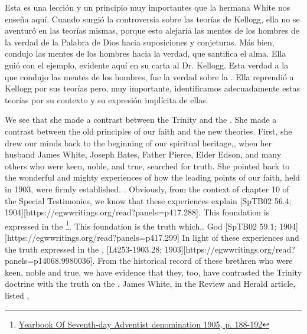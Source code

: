 Esta es una lección y un principio muy importantes que la hermana White nos enseña aquí. Cuando surgió la controversia sobre las teorías de Kellogg, ella no se aventuró en las teorías mismas, porque esto alejaría las mentes de los hombres de la verdad de la Palabra de Dios hacia suposiciones y conjeturas. Más bien, condujo las mentes de los hombres hacia la verdad, que santifica el alma. Ella guió con el ejemplo, evidente aquí en su carta al Dr. Kellogg. Esta verdad a la que condujo las mentes de los hombres, fue la verdad sobre la . Ella reprendió a Kellogg por sus teorías pero, muy importante, identificamos adecuadamente estas teorías por su contexto y su expresión implícita de ellas.


We see that she made a contrast between the Trinity and the . She made a contrast between the old principles of our faith and the new theories. First, she drew our minds back to the beginning of our spiritual heritage,, when her husband James White, Joseph Bates, Father Pierce, Elder Edson, and many others who were keen, noble, and true, searched for truth. She pointed back to the wonderful and mighty experiences of how the leading points of our faith, held in 1903, were firmly established.   . Obviously, from the context of chapter 10 of the Special Testimonies, we know that these experiences explain [SpTB02 56.4; 1904][https://egwwritings.org/read?panels=p417.288]. This foundation is expressed in the \footnote{\href{https://static1.squarespace.com/static/554c4998e4b04e89ea0c4073/t/59d17e24c027d84167e17617/1506901547915/SDA-YB1905+\%28P.+188-192\%29.pdf}{Yearbook Of Seventh-day Adventist denomination 1905, p. 188-192}}. This foundation is the truth which,. God [SpTB02 59.1; 1904][https://egwwritings.org/read?panels=p417.299] In light of these experiences and the truth expressed in the , [Lt253-1903.28; 1903][https://egwwritings.org/read?panels=p14068.9980036]. From the historical record of these brethren who were keen, noble and true, we have evidence that they, too, have contrasted the Trinity doctrine with the truth on the . James White, in the Review and Herald article, listed , 